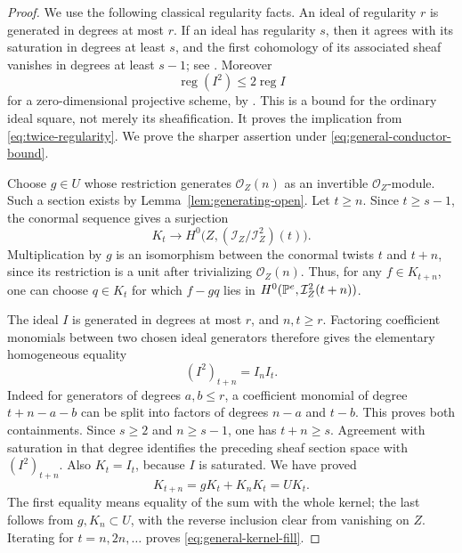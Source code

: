 \begin{proof}
We use the following classical regularity facts. An ideal of
regularity $r$ is generated in degrees at most $r$. If an ideal
has regularity $s$, then it agrees with its saturation in degrees
at least $s$, and the first cohomology of its associated sheaf
vanishes in degrees at least $s-1$; see
\cite[Theorem 1.3]{Sidman}. Moreover
\begin{equation}\label{eq:sidman-square}
 \operatorname{reg}(I^2)\le2\operatorname{reg}I
\end{equation}
for a zero-dimensional projective scheme, by
\cite[Theorem 1.8]{Sidman}. This is a bound for the ordinary ideal
square, not merely its sheafification. It proves the implication
from \eqref{eq:twice-regularity}. We prove the sharper assertion
under \eqref{eq:general-conductor-bound}.

Choose $g\in U$ whose restriction generates $\mathcal O_Z(n)$
as an invertible $\mathcal O_Z$-module. Such a section exists by
Lemma~\ref{lem:generating-open}. Let $t\ge n$. Since $t\ge s-1$,
the conormal sequence gives a surjection
\begin{equation}\label{eq:conormal-surjection}
 K_t\longrightarrow
 H^0\bigl(Z,(\mathcal I_Z/\mathcal I_Z^2)(t)\bigr).
\end{equation}
Multiplication by $g$ is an isomorphism between the conormal twists
$t$ and $t+n$, since its restriction is a unit after trivializing
$\mathcal O_Z(n)$. Thus, for any $f\in K_{t+n}$, one can choose
$q\in K_t$ for which $f-gq$ lies in
$H^0(\mathbb P^e,\mathcal I_Z^2(t+n))$.

The ideal $I$ is generated in degrees at most $r$, and $n,t\ge r$.
Factoring coefficient monomials between two chosen ideal generators
therefore gives the elementary homogeneous equality
\begin{equation}\label{eq:ordinary-square-components}
 (I^2)_{t+n}=I_n I_t.
\end{equation}
Indeed for generators of degrees $a,b\le r$, a coefficient monomial
of degree $t+n-a-b$ can be split into factors of degrees $n-a$ and
$t-b$. This proves both containments. Since $s\ge2$ and
$n\ge s-1$, one has $t+n\ge s$. Agreement with saturation in that
degree identifies the preceding sheaf section space with
$(I^2)_{t+n}$. Also $K_t=I_t$, because $I$ is saturated. We have proved
\begin{equation}\label{eq:normal-layer-fill}
 K_{t+n}=gK_t+K_nK_t=UK_t.
\end{equation}
The first equality means equality of the sum with the whole kernel;
the last follows from $g,K_n\subset U$, with the reverse inclusion
clear from vanishing on $Z$. Iterating for $t=n,2n,\ldots$ proves
\eqref{eq:general-kernel-fill}.


\end{proof}
